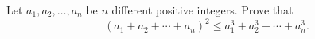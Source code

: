 Let $a_1,a_2,\ldots,a_n$ be $n$ different positive integers. Prove that
\[(a_1+a_2+\cdots+a_n)^2\le a_1^3+a_2^3+\cdots+a_n^3 .\]
